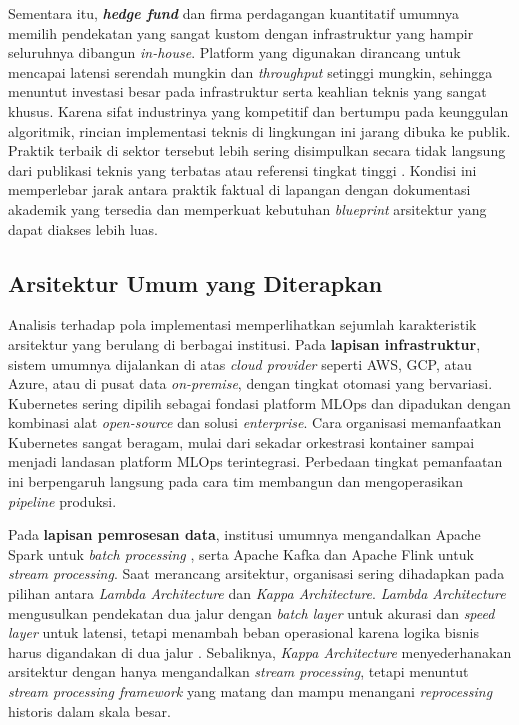 Sementara itu, \textbf{\textit{hedge fund}} dan firma perdagangan kuantitatif umumnya memilih pendekatan yang sangat kustom dengan infrastruktur yang hampir seluruhnya dibangun \textit{in-house}. Platform yang digunakan dirancang untuk mencapai latensi serendah mungkin dan \textit{throughput} setinggi mungkin, sehingga menuntut investasi besar pada infrastruktur serta keahlian teknis yang sangat khusus. Karena sifat industrinya yang kompetitif dan bertumpu pada keunggulan algoritmik, rincian implementasi teknis di lingkungan ini jarang dibuka ke publik. Praktik terbaik di sektor tersebut lebih sering disimpulkan secara tidak langsung dari publikasi teknis yang terbatas atau referensi tingkat tinggi \autocite{paleyes2022challenges,munappy2022data}. Kondisi ini memperlebar jarak antara praktik faktual di lapangan dengan dokumentasi akademik yang tersedia dan memperkuat kebutuhan \textit{blueprint} arsitektur yang dapat diakses lebih luas.

\subsection{Arsitektur Umum yang Diterapkan}

Analisis terhadap pola implementasi memperlihatkan sejumlah karakteristik arsitektur yang berulang di berbagai institusi. Pada \textbf{lapisan infrastruktur}, sistem umumnya dijalankan di atas \textit{cloud provider} seperti AWS, GCP, atau Azure, atau di pusat data \textit{on-premise}, dengan tingkat otomasi yang bervariasi. Kubernetes sering dipilih sebagai fondasi platform MLOps dan dipadukan dengan kombinasi alat \textit{open-source} dan solusi \textit{enterprise}. Cara organisasi memanfaatkan Kubernetes sangat beragam, mulai dari sekadar orkestrasi kontainer sampai menjadi landasan platform MLOps terintegrasi. Perbedaan tingkat pemanfaatan ini berpengaruh langsung pada cara tim membangun dan mengoperasikan \textit{pipeline} produksi.

Pada \textbf{lapisan pemrosesan data}, institusi umumnya mengandalkan Apache Spark untuk \textit{batch processing} \autocite{zaharia2016spark}, serta Apache Kafka \autocite{apachekafka2024} dan Apache Flink \autocite{carbone2015apache} untuk \textit{stream processing}. Saat merancang arsitektur, organisasi sering dihadapkan pada pilihan antara \textit{Lambda Architecture} dan \textit{Kappa Architecture}. \textit{Lambda Architecture} \textcite{marz2015lambda} mengusulkan pendekatan dua jalur dengan \textit{batch layer} untuk akurasi dan \textit{speed layer} untuk latensi, tetapi menambah beban operasional karena logika bisnis harus digandakan di dua jalur \autocite{kreps2014kafka}. Sebaliknya, \textit{Kappa Architecture} \textcite{kreps2014kafka} menyederhanakan arsitektur dengan hanya mengandalkan \textit{stream processing}, tetapi menuntut \textit{stream processing framework} yang matang dan mampu menangani \textit{reprocessing} historis dalam skala besar.

